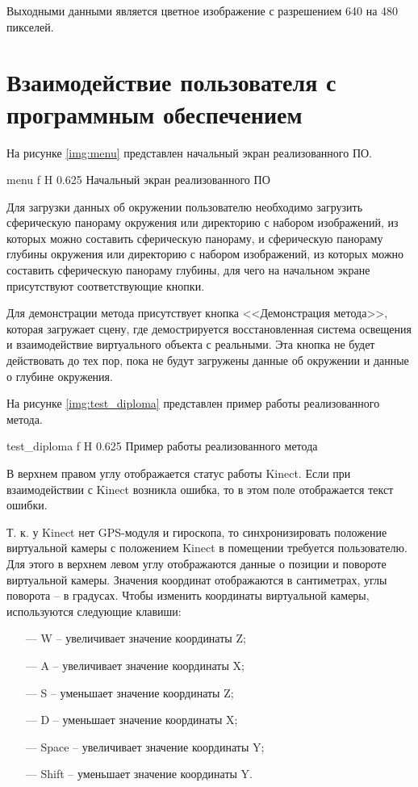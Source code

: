 Выходными данными является цветное изображение с разрешением 640 на 480 пикселей.

\section{Взаимодействие пользователя с программным обеспечением}

На рисунке \ref{img:menu} представлен начальный экран реализованного ПО.

{menu}
{f}
{H}
{0.625\textwidth}
{Начальный экран реализованного ПО}

Для загрузки данных об окружении пользователю необходимо загрузить сферическую панораму окружения или директорию с набором изображений, из которых можно составить сферическую панораму, и сферическую панораму глубины окружения или директорию с набором изображений, из которых можно составить сферическую панораму глубины, для чего на начальном экране присутствуют соответствующие кнопки.

Для демонстрации метода присутствует кнопка <<Демонстрация метода>>, которая загружает сцену, где демострируется восстановленная система освещения и взаимодействие виртуального объекта с реальными. Эта кнопка не будет действовать до тех пор, пока не будут загружены данные об окружении и данные о глубине окружения. 

На рисунке \ref{img:test_diploma} представлен пример работы реализованного метода.

{test_diploma}
{f}
{H}
{0.625\textwidth}
{Пример работы реализованного метода}

В верхнем правом углу отображается статус работы Kinect. Если при взаимодействии с Kinect возникла ошибка, то в этом поле отображается текст ошибки.

Т. к. у Kinect нет GPS-модуля и гироскопа, то синхронизировать положение виртуальной камеры с положением Kinect в помещении требуется пользователю. Для этого в верхнем левом углу отображаются данные о позиции и повороте виртуальной камеры. Значения координат отображаются в сантиметрах, углы поворота -- в градусах. Чтобы изменить координаты виртуальной камеры, используются следующие клавиши:

\begin{itemize}
	\item[---] W -- увеличивает значение координаты Z;
	\item[---] A -- увеличивает значение координаты X;
	\item[---] S -- уменьшает значение координаты Z;
	\item[---] D -- уменьшает значение координаты X;
	\item[---] Space -- увеличивает значение координаты Y;
	\item[---] Shift -- уменьшает значение координаты Y.
\end{itemize}

